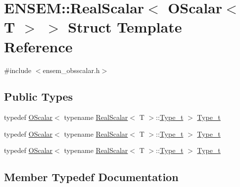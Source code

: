 \hypertarget{structENSEM_1_1RealScalar_3_01OScalar_3_01T_01_4_01_4}{}\section{E\+N\+S\+EM\+:\+:Real\+Scalar$<$ O\+Scalar$<$ T $>$ $>$ Struct Template Reference}
\label{structENSEM_1_1RealScalar_3_01OScalar_3_01T_01_4_01_4}


{\ttfamily \#include $<$ensem\+\_\+obsscalar.\+h$>$}

\subsection*{Public Types}
\begin{DoxyCompactItemize}
\item 
typedef \mbox{\hyperlink{classENSEM_1_1OScalar}{O\+Scalar}}$<$ typename \mbox{\hyperlink{structENSEM_1_1RealScalar}{Real\+Scalar}}$<$ T $>$\+::\mbox{\hyperlink{structENSEM_1_1RealScalar_3_01OScalar_3_01T_01_4_01_4_a6c39297bc962beb39d2b33a9cdf329dd}{Type\+\_\+t}} $>$ \mbox{\hyperlink{structENSEM_1_1RealScalar_3_01OScalar_3_01T_01_4_01_4_a6c39297bc962beb39d2b33a9cdf329dd}{Type\+\_\+t}}
\item 
typedef \mbox{\hyperlink{classENSEM_1_1OScalar}{O\+Scalar}}$<$ typename \mbox{\hyperlink{structENSEM_1_1RealScalar}{Real\+Scalar}}$<$ T $>$\+::\mbox{\hyperlink{structENSEM_1_1RealScalar_3_01OScalar_3_01T_01_4_01_4_a6c39297bc962beb39d2b33a9cdf329dd}{Type\+\_\+t}} $>$ \mbox{\hyperlink{structENSEM_1_1RealScalar_3_01OScalar_3_01T_01_4_01_4_a6c39297bc962beb39d2b33a9cdf329dd}{Type\+\_\+t}}
\item 
typedef \mbox{\hyperlink{classENSEM_1_1OScalar}{O\+Scalar}}$<$ typename \mbox{\hyperlink{structENSEM_1_1RealScalar}{Real\+Scalar}}$<$ T $>$\+::\mbox{\hyperlink{structENSEM_1_1RealScalar_3_01OScalar_3_01T_01_4_01_4_a6c39297bc962beb39d2b33a9cdf329dd}{Type\+\_\+t}} $>$ \mbox{\hyperlink{structENSEM_1_1RealScalar_3_01OScalar_3_01T_01_4_01_4_a6c39297bc962beb39d2b33a9cdf329dd}{Type\+\_\+t}}
\end{DoxyCompactItemize}


\subsection{Member Typedef Documentation}
\mbox{\label{structENSEM_1_1RealScalar_3_01OScalar_3_01T_01_4_01_4_a6c39297bc962beb39d2b33a9cdf329dd}} 
